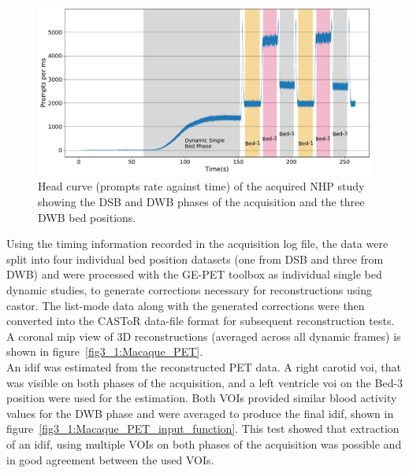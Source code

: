 \begin{figure} [ht!]
\centering
\includegraphics[scale=0.45,angle=0]{3_Results/3_1_DWB_Optimization/figures/3_1_Macaque_Head_curve_Phases.pdf}
\caption{Head curve (prompts rate against time) of the acquired NHP study showing the DSB and DWB phases of the acquisition and the three DWB bed positions.}
\label{fig3_1:Macaque_Head_Curve_Phases}
\end{figure}
%
Using the timing information recorded in the acquisition log file, the data were split into four individual bed position datasets (one from DSB and three from DWB) and were processed with the GE-PET toolbox as individual single bed dynamic studies, to generate corrections necessary for reconstructions using \gls{castor}. The list-mode data along with the generated corrections were then converted into the CASToR data-file format for subsequent reconstruction tests. A coronal \gls{mip} view of 3D reconstructions (averaged across all dynamic frames) is shown in figure~\ref{fig3_1:Macaque_PET}. \\
An \gls{idif} was estimated from the reconstructed PET data. A right carotid \gls{voi}, that was visible on both phases of the acquisition, and a left ventricle \gls{voi} on the Bed-3 position were used for the estimation. Both VOIs provided similar blood activity values for the DWB phase and were averaged to produce the final \gls{idif}, shown in figure~\ref{fig3_1:Macaque_PET_input_function}. This test showed that extraction of an \gls{idif}, using multiple VOIs on both phases of the acquisition was possible and in good agreement between the used VOIs.
%
